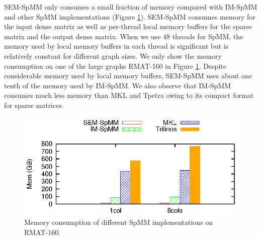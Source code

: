 SEM-SpMM only consumes a small fraction of memory compared with IM-SpMM and
other SpMM implementations (Figure \ref{perf:spmm_mem}). SEM-SpMM consumes
memory for the input dense matrix as well as per-thread local memory buffers
for the sparse matrix and the output dense matrix. When we use 48 threads for
SpMM, the memory used by local memory buffers in each thread is significant
but is relatively constant for different graph sizes. We only show the memory
consumption on one of the large graphs RMAT-160 in Figure \ref{perf:spmm_mem}.
Despite considerable memory used by local memory buffers, SEM-SpMM uses about
one tenth of the memory
used by IM-SpMM. We also observe that IM-SpMM consumes much less memory than
MKL and Tpetra owing to its compact format for sparse matrices.

\begin{figure}
	\begin{center}
		\footnotesize
		\includegraphics[scale=1]{SpMM_figs/SpMM-mem.eps}
		\caption{Memory consumption of different SpMM implementations on
		RMAT-160.}
		\label{perf:spmm_mem}
	\end{center}
\end{figure}


